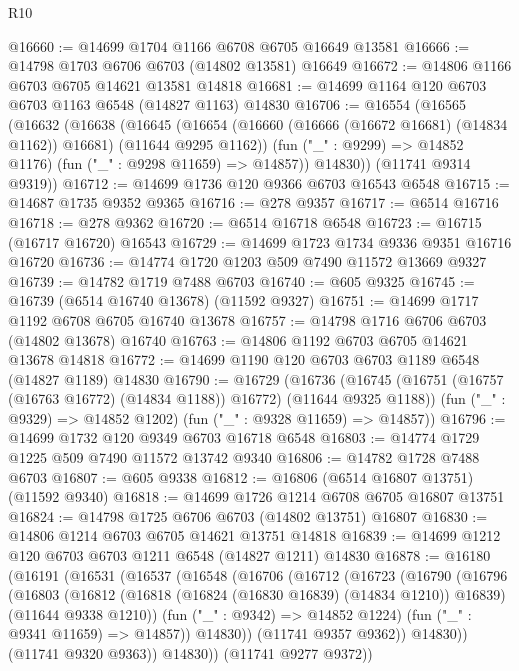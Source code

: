 \begin{lexlean}{R10}
\begin{coremodule}
@16660 := @14699 @1704 @1166 @6708 @6705 @16649 @13581
@16666 := @14798 @1703 @6706 @6703 (@14802 @13581) @16649
@16672 := @14806 @1166 @6703 @6705 @14621 @13581 @14818
@16681 := @14699 @1164 @120 @6703 @6703 @1163 @6548 (@14827 @1163) @14830
@16706 := @16554
    (@16565
      (@16632
        (@16638
          (@16645
            (@16654 (@16660 (@16666 (@16672 @16681) (@14834 @1162)) @16681) (@11644 @9295 @1162))
            (fun ("_" : @9299) => @14852 @1176)
            (fun ("_" : @9298 @11659) => @14857))
          @14830))
      (@11741 @9314 @9319))
@16712 := @14699 @1736 @120 @9366 @6703 @16543 @6548
@16715 := @14687 @1735 @9352 @9365
@16716 := @278 @9357
@16717 := @6514 @16716
@16718 := @278 @9362
@16720 := @6514 @16718 @6548
@16723 := @16715 (@16717 @16720) @16543
@16729 := @14699 @1723 @1734 @9336 @9351 @16716 @16720
@16736 := @14774 @1720 @1203 @509 @7490 @11572 @13669 @9327
@16739 := @14782 @1719 @7488 @6703
@16740 := @605 @9325
@16745 := @16739 (@6514 @16740 @13678) (@11592 @9327)
@16751 := @14699 @1717 @1192 @6708 @6705 @16740 @13678
@16757 := @14798 @1716 @6706 @6703 (@14802 @13678) @16740
@16763 := @14806 @1192 @6703 @6705 @14621 @13678 @14818
@16772 := @14699 @1190 @120 @6703 @6703 @1189 @6548 (@14827 @1189) @14830
@16790 := @16729
    (@16736
      (@16745 (@16751 (@16757 (@16763 @16772) (@14834 @1188)) @16772) (@11644 @9325 @1188))
      (fun ("_" : @9329) => @14852 @1202)
      (fun ("_" : @9328 @11659) => @14857))
@16796 := @14699 @1732 @120 @9349 @6703 @16718 @6548
@16803 := @14774 @1729 @1225 @509 @7490 @11572 @13742 @9340
@16806 := @14782 @1728 @7488 @6703
@16807 := @605 @9338
@16812 := @16806 (@6514 @16807 @13751) (@11592 @9340)
@16818 := @14699 @1726 @1214 @6708 @6705 @16807 @13751
@16824 := @14798 @1725 @6706 @6703 (@14802 @13751) @16807
@16830 := @14806 @1214 @6703 @6705 @14621 @13751 @14818
@16839 := @14699 @1212 @120 @6703 @6703 @1211 @6548 (@14827 @1211) @14830
@16878 := @16180
    (@16191
      (@16531
        (@16537
          (@16548
            (@16706
              (@16712
                (@16723
                  (@16790
                    (@16796
                      (@16803
                        (@16812
                          (@16818 (@16824 (@16830 @16839) (@14834 @1210)) @16839)
                          (@11644 @9338 @1210))
                        (fun ("_" : @9342) => @14852 @1224)
                        (fun ("_" : @9341 @11659) => @14857))
                      @14830))
                  (@11741 @9357 @9362))
                @14830))
            (@11741 @9320 @9363))
          @14830))
      (@11741 @9277 @9372))

\end{coremodule}
\end{lexlean}

